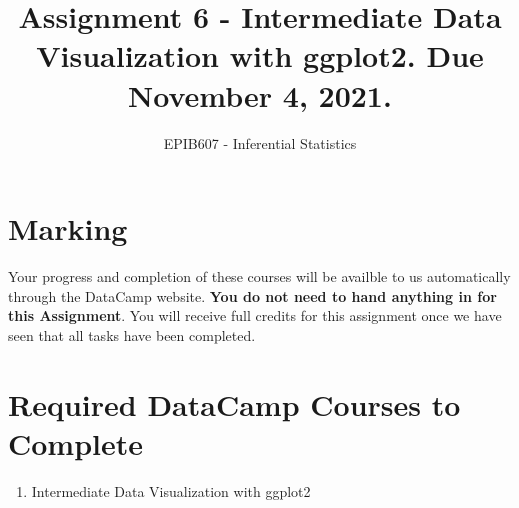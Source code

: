 \documentclass[letterpaper,12pt,twoside,]{pinp}
\title{Assignment 6 - Intermediate Data Visualization with ggplot2. Due
November 4, 2021.}
\author[a]{EPIB607 - Inferential Statistics}
\affil[a]{Fall 2021, McGill University}
\providecommand{\tightlist}{%
  \setlength{\itemsep}{0pt}\setlength{\parskip}{0pt}}
\begin{document}
\verticaladjustment{-2pt}

\maketitle
\thispagestyle{firststyle}



\tableofcontents

\vspace*{1in}

\hypertarget{marking}{%
\section{Marking}\label{marking}}

Your progress and completion of these courses will be availble to us
automatically through the DataCamp website. \textbf{You do not need to
hand anything in for this Assignment}. You will receive full credits for
this assignment once we have seen that all tasks have been completed.

\hypertarget{required-datacamp-courses-to-complete}{%
\section{Required DataCamp Courses to
Complete}\label{required-datacamp-courses-to-complete}}

\begin{enumerate}
\def\labelenumi{\arabic{enumi}.}
\tightlist
\item
  Intermediate Data Visualization with ggplot2
\end{enumerate}

\end{document}

